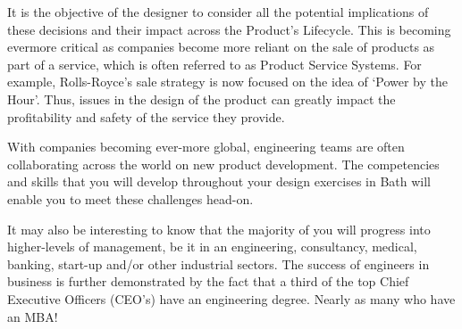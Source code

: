 It is the objective of the designer to consider all the potential implications of these decisions and their impact across the Product's Lifecycle. This is becoming evermore critical as companies become more reliant on the sale of products as part of a service, which is often referred to as Product Service Systems. For example, Rolls-Royce's sale strategy is now focused on the idea of `Power by the Hour'. Thus, issues in the design of the product can greatly impact the profitability and safety of the service they provide.

With companies becoming ever-more global, engineering teams are often collaborating across the world on new product development. The competencies and skills that you will develop throughout your design exercises in Bath will enable you to meet these challenges head-on.

It may also be interesting to know that the majority of you will progress into higher-levels of management, be it in an engineering, consultancy, medical, banking, start-up and/or other industrial sectors. The success of engineers in business is further demonstrated by the fact that a third of the top Chief Executive Officers (CEO's) have an engineering degree.\cite{bi2011}\cite{hbr2014} Nearly as many who have an MBA! 